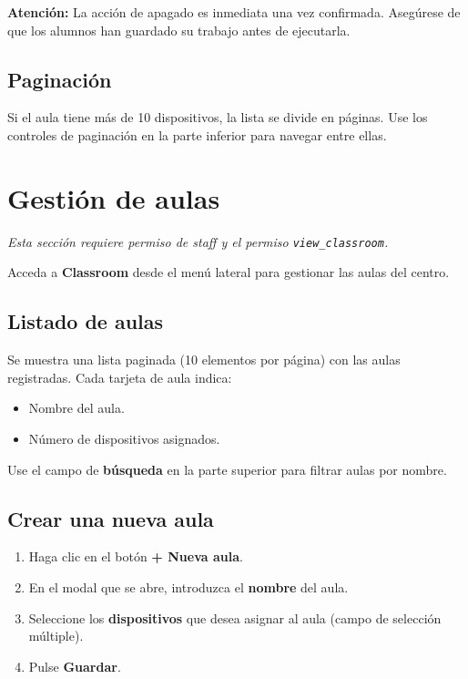 \documentclass[12pt,a4paper]{article}
\begin{document}
\begin{warnnote}
\textbf{Atención:} La acción de apagado es inmediata una vez confirmada. Asegúrese de que los alumnos han guardado su trabajo antes de ejecutarla.
\end{warnnote}

\subsection{Paginación}

Si el aula tiene más de 10 dispositivos, la lista se divide en páginas. Use los controles de paginación en la parte inferior para navegar entre ellas.

\section{Gestión de aulas}

\textit{Esta sección requiere permiso de staff y el permiso \texttt{view\_classroom}.}

Acceda a \textbf{Classroom} desde el menú lateral para gestionar las aulas del centro.

\subsection{Listado de aulas}

Se muestra una lista paginada (10 elementos por página) con las aulas registradas. Cada tarjeta de aula indica:

\begin{itemize}
    \item Nombre del aula.
    \item Número de dispositivos asignados.
\end{itemize}

Use el campo de \textbf{búsqueda} en la parte superior para filtrar aulas por nombre.

\subsection{Crear una nueva aula}

\begin{enumerate}
    \item Haga clic en el botón \textbf{+ Nueva aula}.
    \item En el modal que se abre, introduzca el \textbf{nombre} del aula.
    \item Seleccione los \textbf{dispositivos} que desea asignar al aula (campo de selección múltiple).
    \item Pulse \textbf{Guardar}.
\end{enumerate}
\end{document}
